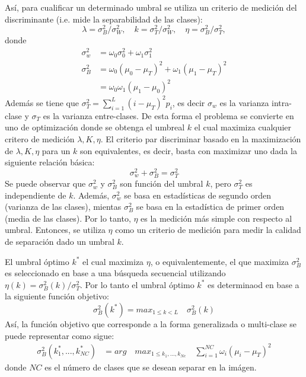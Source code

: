 \documentclass[preprint,12pt]{elsarticle}
\begin{document}
Así, para cualificar un determinado umbral se utiliza un criterio de medición del discriminante (i.e. mide la separabilidad de las clases):
\begin{equation}
    \lambda = \sigma_B^2/\sigma_W^2, \quad k = \sigma_T^2/\sigma_W^2, \quad \eta = \sigma_B^2/\sigma_T^2,
\end{equation}
donde
\begin{equation}
    \begin{split}
        \sigma_w^2 &= \omega_0 \sigma_0^2 + \omega_1 \sigma_1^2 \\
        \sigma_B^2 &= \omega_0(\mu_0 - \mu_T)^2 + \omega_1(\mu_1 - \mu_T)^2 \\
        &= \omega_0 \omega_1(\mu_1 - \mu_0)^2
    \end{split}
\end{equation}
Además se tiene que $\sigma_T^2 = \sum_{i=1}^L (i-\mu_T)^2 p_i$, es decir $\sigma_w$ es la varianza intra-clase y $\sigma_T$ es la varianza entre-clases.
%
De esta forma el problema se convierte en uno de optimización donde se obtenga el umbreal $k$ el cual maximiza cualquier critero de medición $\lambda, K, \eta$.
%
El criterio par discriminar basado en la maximización de $\lambda, K, \eta$ para un $k$ son equivalentes, es decir, basta con maximizar uno dada la siguiente relación básica:
\begin{equation}
    \sigma_w^2 + \sigma_B^2 = \sigma_T^2
\end{equation}
Se puede observar que $\sigma_w^2$ y $\sigma_B^2$ son función del umbral $k$, pero $\sigma_T^2$ es independiente de $k$.
%
Además, $\sigma_w^2$ se basa en estadísticas de segundo orden (varianza de las clases), mientas $\sigma_B^2$ se basa en la estadística de primer orden (media de las clases).
%
Por lo tanto, $\eta$ es la medición más simple con respecto al umbral.
%
Entonces, se utiliza $\eta$ como un criterio de medición para medir la calidad de separación dado un umbral $k$.
%

El umbral óptimo $k^*$ el cual maximiza $\eta$, o equivalentemente, el que maximiza $\sigma_B^2$ es seleccionado en base a una búsqueda secuencial utilizando $\eta(k) = \sigma_B^2(k)/\sigma_T^2$.
%
Por lo tanto el umbral óptimo $k^*$ es determinaod en base a la siguiente función objetivo:
\begin{equation}
    \sigma_B^2 (k^*) = max_{1 \leq k < L} \quad \sigma_B^2(k)
\end{equation}
Así, la función objetivo que corresponde a la forma generalizada o multi-clase se puede representar como sigue:
\begin{equation}
    \begin{split}
        \sigma_B^2( k_1^*, ..., k_{NC}^*) &= arg \quad max_{1\leq k_1,...,k_{Nc}} \quad  \sum_{i=1}^{NC} \omega_i (\mu_i - \mu_T)^2 
    \end{split}
\end{equation}
donde $NC$ es el número de clases que se desean separar en la imágen.
\end{document}
